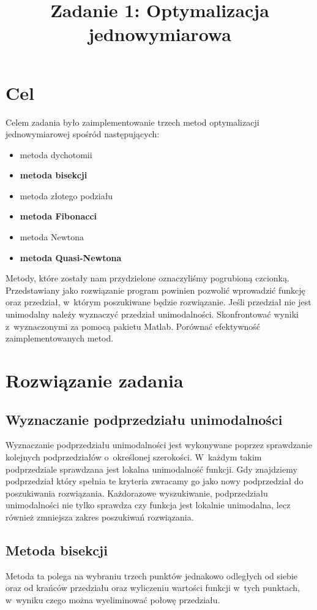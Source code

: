 \documentclass{classrep}
\author{
  \studentinfo{Paweł Musiał}{nr albumu 1} \and
  \studentinfo{Łukasz Michalski}{178724}
}
\title{Zadanie 1: Optymalizacja jednowymiarowa} %
\begin{document}
\maketitle


\addtocounter{footnote}{1}

\section{Cel}
Celem zadania było zaimplementowanie trzech metod optymalizacji jednowymiarowej spośród następujących:
\begin{itemize}
	\item	metoda dychotomii
	\item	\textbf{metoda bisekcji}
	\item	metoda złotego podziału
	\item	\textbf{metoda Fibonacci}
	\item	metoda Newtona
	\item	\textbf{metoda Quasi-Newtona}
\end{itemize}
Metody, które zostały nam przydzielone oznaczyliśmy pogrubioną czcionką. Przedstawiany jako rozwiązanie program powinien pozwolić wprowadzić funkcję oraz przedział, w~którym poszukiwane będzie rozwiązanie. Jeśli przedział nie jest unimodalny należy wyznaczyć przedział unimodalności. Skonfrontować wyniki z~wyznaczonymi za pomocą pakietu Matlab. Porównać efektywność zaimplementowanych metod.

\section{Rozwiązanie zadania}
\subsection{Wyznaczanie podprzedziału unimodalności}
Wyznaczanie podprzedziału unimodalności jest wykonywane poprzez sprawdzanie kolejnych podprzedziałów o~określonej szerokości. W~każdym takim podprzedziale sprawdzana jest lokalna unimodalność funkcji. Gdy znajdziemy podprzedział który spełnia te kryteria zwracamy go jako nowy podprzedział do poszukiwania rozwiązania. Każdorazowe wyszukiwanie, podprzedziału unimodalności nie tylko sprawdza czy funkcja jest lokalnie unimodalna, lecz również zmniejsza zakres poszukiwań rozwiązania.

\subsection{Metoda bisekcji \cite{1}}
Metoda ta polega na wybraniu trzech punktów jednakowo odległych od siebie oraz od krańców przedziału oraz wyliczeniu wartości funkcji w~tych punktach, w~wyniku czego można wyeliminować połowę przedziału.
\end{document}

